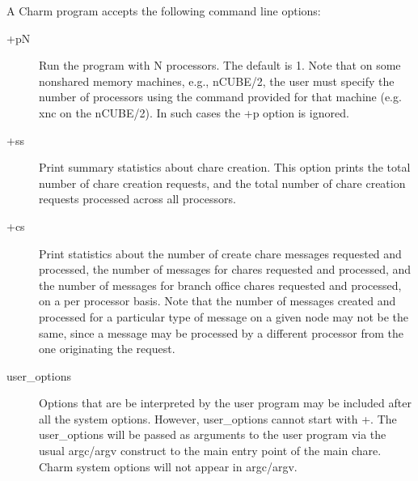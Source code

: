 A Charm program accepts the following command line options:
\begin{description}

\item[{\fexec +pN}] Run the program with N processors. The default is 1.
Note that on some nonshared memory machines, e.g., nCUBE/2, the user must
specify the number of processors using the command provided for that
machine (e.g. {\fexec xnc} on the nCUBE/2).
In such cases the {\fexec +p} option is ignored.



\item[{\fexec +ss}] Print summary statistics about chare creation.  This option
prints the total number of chare creation requests, and the total number of
chare creation requests processed across all processors.

\item[{\fexec +cs}] Print statistics about the number of create chare messages
requested and processed, the number of messages for chares requested and 
processed, and the number of messages for branch office chares requested and
processed, on a per processor basis.  Note that the number of messages 
created and processed for a particular type of message on a given node 
may not be the same, since a message may be processed by a different
processor from the one originating the request.


\item[{\fexec user\_options}] Options that are be interpreted by the user
program may be included after all the system options. 
However, {\fexec user\_options} cannot start with +.
The {\fexec user\_options} will be passed as arguments to the user program 
via the usual {\fcmd argc/argv} construct to the {\fcmd main}
entry point of the main chare. 
Charm system options will not appear in {\fcmd argc/argv}.

\end{description}

